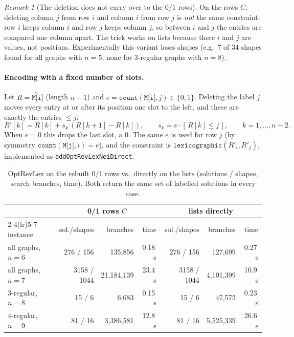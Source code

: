 \documentclass[11pt,a4paper]{article}
\theoremstyle{definition}
\theoremstyle{remark}
\newtheorem{remark}[theorem]{Remark}
\begin{document}
\begin{remark}[The deletion does not carry over to the 0/1 rows]
On the rows $C$, deleting column $j$ from row $i$ and column $i$ from row $j$ is \emph{not}
the same constraint: row $i$ keeps column $i$ and row $j$ keeps column $j$, so between $i$
and $j$ the entries are compared one column apart. The trick works on lists because there
$i$ and $j$ are values, not positions. Experimentally this variant loses shapes
(e.g.\ $7$ of $34$ shapes found for all graphs with $n=5$, none for $3$-regular graphs with
$n=8$).
\end{remark}

\paragraph{Encoding with a fixed number of slots.}
Let $R=\overleftarrow{\texttt{M[i]}}$ (length $n-1$) and
$e=\texttt{count}(\texttt{M[i]},j)\in\{0,1\}$. Deleting the label $j$ moves every entry at or
after its position one slot to the left, and these are exactly the entries $\le j$:
\[
  R'[k]=R[k]+s_k\,(R[k+1]-R[k]),\qquad s_k=e\cdot[\,R[k]\le j\,],\qquad k=1,\dots,n-2.
\]
When $e=0$ this drops the last slot, a $0$. The same $e$ is used for row $j$ (by symmetry
$\texttt{count}(\texttt{M[j]},i)=e$), and the constraint is
$\texttt{lexicographic}(R'_i,R'_j)$, implemented as \texttt{addOptRevLexNeiDirect}.

\begin{table}[ht]
\centering
\caption{OptRevLex on the rebuilt 0/1 rows vs.\ directly on the lists (solutions / shapes,
search branches, time). Both return the same set of labelled solutions in every case.}
\label{tab:direct}
\begin{tabular}{l rrr rrr}
\toprule
 & \multicolumn{3}{c}{0/1 rows $C$} & \multicolumn{3}{c}{lists directly}\\
\cmidrule(lr){2-4}\cmidrule(lr){5-7}
instance & sol./shapes & branches & time & sol./shapes & branches & time\\
\midrule
all graphs, $n=6$  & 276 / 156   & 135{,}856    & 0.18\,s & 276 / 156   & 127{,}699   & 0.27\,s\\
all graphs, $n=7$  & 3158 / 1044 & 21{,}184{,}139 & 23.4\,s & 3158 / 1044 & 4{,}101{,}399 & 10.9\,s\\
$3$-regular, $n=8$ & 15 / 6      & 6{,}683      & 0.15\,s & 15 / 6      & 47{,}572    & 0.23\,s\\
$4$-regular, $n=9$ & 81 / 16     & 3{,}386{,}581  & 12.8\,s & 81 / 16     & 5{,}525{,}339 & 26.6\,s\\
\bottomrule
\end{tabular}
\end{table}
\end{document}
